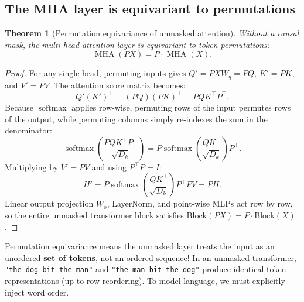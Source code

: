 \documentclass[11pt,a4paper]{article}
\DeclareMathOperator{\softmax}{softmax}
\DeclareMathOperator{\MHA}{MHA}
\newcommand{\slides}[1]{\par\nopagebreak\noindent{\normalfont\small\emph{(slides #1)}}\par\nopagebreak\vspace{2pt}}
\theoremstyle{definition}
\theoremstyle{plain}
\newtheorem{theorem}[definition]{Theorem}
\begin{document}
\subsection{The MHA layer is equivariant to permutations}\slides{45 / 84}
\begin{theorem}[Permutation equivariance of unmasked attention]\label{thm:mha_equiv}
Without a causal mask, the multi-head attention layer is equivariant to token permutations:
\begin{equation}
\MHA(PX) = P \cdot \MHA(X).
\end{equation}
\end{theorem}
\begin{proof}
For any single head, permuting inputs gives $Q' = PX W_q = PQ$, $K' = PK$, and $V' = PV$. The attention score matrix becomes:
\begin{equation}
Q' (K')^\top = (PQ)(PK)^\top = P Q K^\top P^\top.
\end{equation}
Because $\softmax$ applies row-wise, permuting rows of the input permutes rows of the output, while permuting columns simply re-indexes the sum in the denominator:
\begin{equation}
\softmax\left( \frac{P Q K^\top P^\top}{\sqrt{D_k}} \right) = P \softmax\left( \frac{Q K^\top}{\sqrt{D_k}} \right) P^\top.
\end{equation}
Multiplying by $V' = PV$ and using $P^\top P = I$:
\begin{equation}
H' = P \softmax\left( \frac{Q K^\top}{\sqrt{D_k}} \right) P^\top P V = P H.
\end{equation}
Linear output projection $W_o$, LayerNorm, and point-wise MLPs act row by row, so the entire unmasked transformer block satisfies $\mathrm{Block}(PX) = P \cdot \mathrm{Block}(X)$.
\end{proof}

\begin{intuition}
Permutation equivariance means the unmasked layer treats the input as an unordered \textbf{set of tokens}, not an ordered sequence! In an unmasked transformer, \texttt{"the dog bit the man"} and \texttt{"the man bit the dog"} produce identical token representations (up to row reordering). To model language, we must explicitly inject word order.
\end{intuition}
\end{document}
